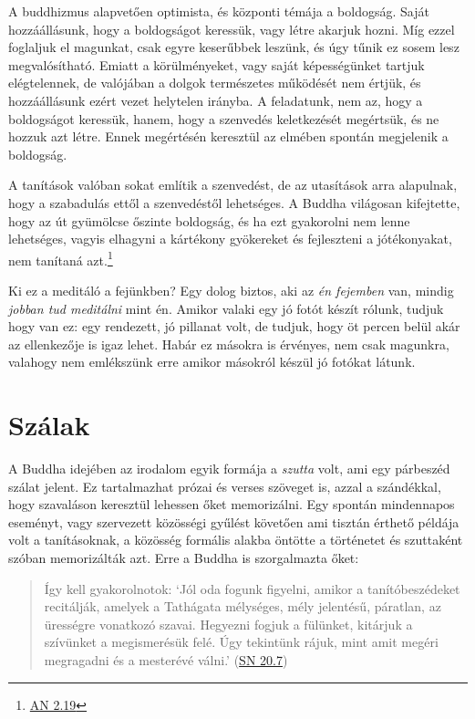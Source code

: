 A buddhizmus alapvetően optimista, és központi témája a boldogság. Saját
hozzáállásunk, hogy a boldogságot keressük, vagy létre akarjuk hozni.
Míg ezzel foglaljuk el magunkat, csak egyre keserűbbek leszünk, és úgy
tűnik ez sosem lesz megvalósítható. Emiatt a körülményeket, vagy saját
képességünket tartjuk elégtelennek, de valójában a dolgok természetes
működését nem értjük, és hozzáállásunk ezért vezet helytelen irányba. A
feladatunk, nem az, hogy a boldogságot keressük, hanem, hogy a szenvedés
keletkezését megértsük, és ne hozzuk azt létre. Ennek megértésén
keresztül az elmében spontán megjelenik a boldogság.

A tanítások valóban sokat említik a szenvedést, de az utasítások arra
alapulnak, hogy a szabadulás ettől a szenvedéstől lehetséges. A Buddha
világosan kifejtette, hogy az út gyümölcse őszinte boldogság, és ha ezt
gyakorolni nem lenne lehetséges, vagyis elhagyni a kártékony gyökereket
és fejleszteni a jótékonyakat, nem tanítaná azt.\footnote{\href{https://suttacentral.net/an2.11-20/en/thanissaro}{AN
  2.19}}

Ki ez a meditáló a fejünkben? Egy dolog biztos, aki az \emph{én
fejemben} van, mindig \emph{jobban tud meditálni} mint én. Amikor valaki
egy jó fotót készít rólunk, tudjuk hogy van ez: egy rendezett, jó
pillanat volt, de tudjuk, hogy öt percen belül akár az ellenkezője is
igaz lehet. Habár ez másokra is érvényes, nem csak magunkra, valahogy
nem emlékszünk erre amikor másokról készül jó fotókat látunk.

\section{Szálak}

A Buddha idejében az irodalom egyik formája a \emph{szutta} volt, ami
egy párbeszéd szálat jelent. Ez tartalmazhat prózai és verses szöveget
is, azzal a szándékkal, hogy szavaláson keresztül lehessen őket
memorizálni. Egy spontán mindennapos eseményt, vagy szervezett közösségi
gyűlést követően ami tisztán érthető példája volt a tanításoknak, a
közösség formális alakba öntötte a történetet és szuttaként szóban
memorizálták azt. Erre a Buddha is szorgalmazta őket:

\begin{quote}
Így kell gyakorolnotok: `Jól oda fogunk figyelni, amikor a
tanítóbeszédeket recitálják, amelyek a Tathágata mélységes, mély
jelentésű, páratlan, az ürességre vonatkozó szavai. Hegyezni fogjuk a
fülünket, kitárjuk a szívünket a megismerésük felé. Úgy tekintünk rájuk,
mint amit megéri megragadni és a mesterévé válni.'
(\href{https://a-buddha-ujja.hu/sn-20.7/hu/fenyvesi-robert}{SN 20.7})
\end{quote}

